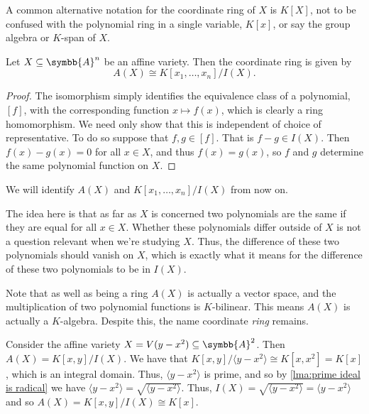 \documentclass[fleqn]{NotesClass}
\newcommand{\affine}{\symbb{A}}
\newcommand{\isomorphic}{\cong}
\begin{document}
    \begin{ntn}{}{}
        A common alternative notation for the coordinate ring of \(X\) is \(K[X]\), not to be confused with the polynomial ring in a single variable, \(K[x]\), or say the group algebra or \(K\)-span of \(X\).
    \end{ntn}
    
    \begin{lma}{}{}
        Let \(X \subseteq \affine^n\) be an affine variety.
        Then the coordinate ring is given by
        \begin{equation}
            A(X) \isomorphic K[x_1, \dotsc, x_n] / I(X).
        \end{equation}
        \begin{proof}
            The isomorphism simply identifies the equivalence class of a polynomial, \([f]\), with the corresponding function \(x \mapsto f(x)\), which is clearly a ring homomorphism.
            We need only show that this is independent of choice of representative.
            To do so suppose that \(f, g \in [f]\).
            That is \(f - g \in I(X)\).
            Then \(f(x) - g(x) = 0\) for all \(x \in X\), and thus \(f(x) = g(x)\), so \(f\) and \(g\) determine the same polynomial function on \(X\).
        \end{proof}
    \end{lma}
    
    We will identify \(A(X)\) and \(K[x_1, \dotsc, x_n]/I(X)\) from now on.
    
    The idea here is that as far as \(X\) is concerned two polynomials are the same if they are equal for all \(x \in X\).
    Whether these polynomials differ outside of \(X\) is not a question relevant when we're studying \(X\).
    Thus, the difference of these two polynomials should vanish on \(X\), which is exactly what it means for the difference of these two polynomials to be in \(I(X)\).
    
    Note that as well as being a ring \(A(X)\) is actually a vector space, and the multiplication of two polynomial functions is \(K\)-bilinear.
    This means \(A(X)\) is actually a \(K\)-algebra.
    Despite this, the name coordinate \emph{ring} remains.
    
    \begin{exm}{}{}
        Consider the affine variety \(X = V(y - x^2) \subseteq \affine^2\).
        Then \(A(X) = K[x, y] / I(X)\).
        We have that \(K[x, y] / \langle y - x^2 \rangle \isomorphic K[x, x^2] = K[x]\), which is an integral domain.
        Thus, \(\langle y - x^2 \rangle\) is prime, and so by \cref{lma:prime ideal is radical} we have \(\langle y - x^2 \rangle = \sqrt{\langle y - x^2 \rangle}\).
        Thus, \(I(X) = \sqrt{\langle y - x^2 \rangle} = \langle y - x^2 \rangle\) and so \(A(X) = K[x, y] / I(X) \isomorphic K[x]\).
    \end{exm}
    
\end{document}
